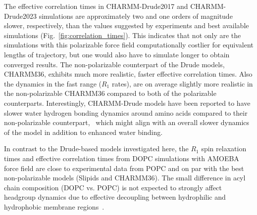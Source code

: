 \documentclass[journal=jacsat,manuscript=article,layout=singlecolumn]{achemso}
\begin{document}
The effective correlation times in CHARMM-Drude2017 and CHARMM-Drude2023 simulations are approximately two  and one orders of magnitude slower, respectively, than the values suggested by experiments and best available simulations (Fig.~\ref{fig:correlation_times}). This indicates that not only are the simulations with this polarizable force field computationally costlier for equivalent lengths of trajectory, but one would also have to simulate longer to obtain converged results. The non-polarizable counterpart of the Drude models, CHARMM36, exhibits much more realistic, faster effective correlation times. Also the dynamics in the fast range ($R_{1}$ rates), are on average slightly more realistic in the non-polarizable CHARMM36 compared to both of the polarizable counterparts. Interestingly, CHARMM-Drude models have been reported to have slower water hydrogen bonding dynamics around amino acids compared to their non-polarizable counterpart,~\cite{Ngo2019} which might align with an overall slower dynamics of the model in addition to enhanced water binding. 

In contrast to the Drude-based models investigated here, the $R_1$ spin relaxation times and effective correlation times from DOPC simulations with AMOEBA force field are close to experimental data from POPC and on par with the best non-polarizable models (Slipids and CHARMM36). The small difference in acyl chain composition (DOPC vs. POPC) is not expected to strongly affect headgroup dynamics due to effective decoupling between hydrophilic and hydrophobic membrane regions~\cite{Antila2022rot, Klauda08}.
\end{document}
